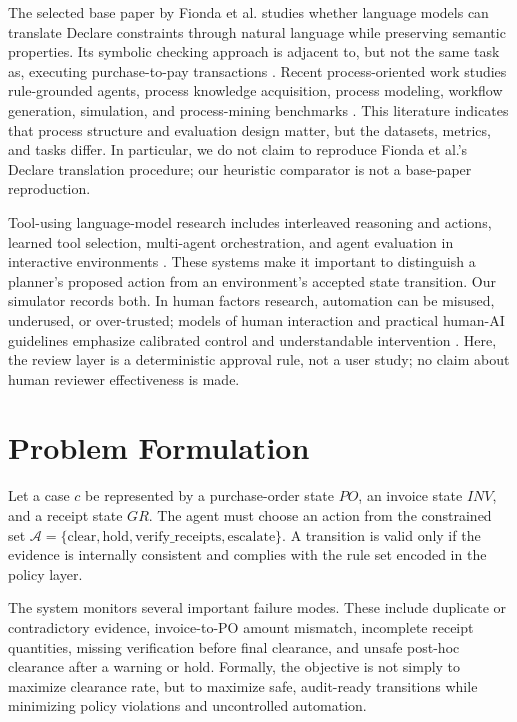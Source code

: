 \documentclass[conference]{IEEEtran}
\begin{document}
The selected base paper by Fionda et al. studies whether language models can translate Declare constraints through natural language while preserving semantic properties. Its symbolic checking approach is adjacent to, but not the same task as, executing purchase-to-pay transactions \cite{fionda2025large}. Recent process-oriented work studies rule-grounded agents, process knowledge acquisition, process modeling, workflow generation, simulation, and process-mining benchmarks \cite{kaltenpoth2025rules,schinckus2026process,qiao2025benchmark,jha2025itbench,kirchdorfer2025multiagent,dasilva2025declarative,kourani2026modeling,rebmann2025semantics,berti2025pmllm}. This literature indicates that process structure and evaluation design matter, but the datasets, metrics, and tasks differ. In particular, we do not claim to reproduce Fionda et al.'s Declare translation procedure; our heuristic comparator is not a base-paper reproduction.

Tool-using language-model research includes interleaved reasoning and actions, learned tool selection, multi-agent orchestration, and agent evaluation in interactive environments \cite{yao2023react,schick2023toolformer,wu2023autogen,qin2024toolllm,liu2024agentbench,zhou2024webarena,brown2020fewshot,openai2023gpt4}. These systems make it important to distinguish a planner's proposed action from an environment's accepted state transition. Our simulator records both. In human factors research, automation can be misused, underused, or over-trusted; models of human interaction and practical human-AI guidelines emphasize calibrated control and understandable intervention \cite{parasuraman1997automation,parasuraman2000interaction,amershi2019guidelines,nist2023airmf}. Here, the review layer is a deterministic approval rule, not a user study; no claim about human reviewer effectiveness is made.

\section{Problem Formulation}

Let a case $c$ be represented by a purchase-order state $PO$, an invoice state $INV$, and a receipt state $GR$. The agent must choose an action from the constrained set $\mathcal{A} = \{\text{clear}, \text{hold}, \text{verify\_receipts}, \text{escalate}\}$. A transition is valid only if the evidence is internally consistent and complies with the rule set encoded in the policy layer.

The system monitors several important failure modes. These include duplicate or contradictory evidence, invoice-to-PO amount mismatch, incomplete receipt quantities, missing verification before final clearance, and unsafe post-hoc clearance after a warning or hold. Formally, the objective is not simply to maximize clearance rate, but to maximize safe, audit-ready transitions while minimizing policy violations and uncontrolled automation.
\end{document}
